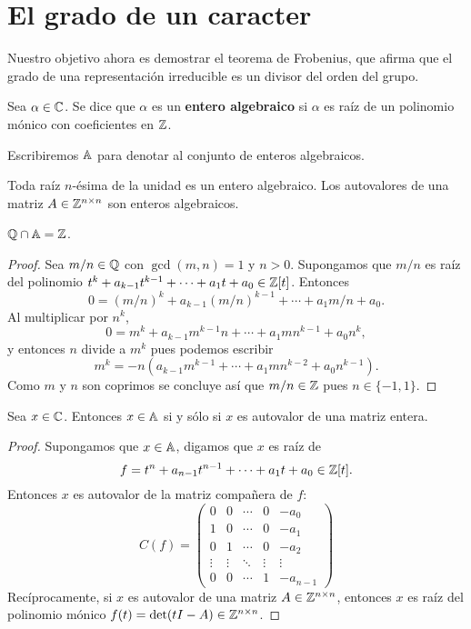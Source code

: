 \chapter{El grado de un caracter}

Nuestro objetivo ahora es demostrar el teorema de Frobenius, que afirma
que el grado de una representación irreducible es un divisor del orden del grupo. 

\begin{definition}
	Sea $\alpha\in\mathbb{C}$. Se dice que $\alpha$ es un \textbf{entero algebraico} si
	$\alpha$ es raíz de un polinomio mónico con coeficientes en $\mathbb{Z}$.  
\end{definition}

Escribiremos $\mathbb{A}$ para denotar al conjunto de enteros algebraicos.  

Toda raíz $n$-ésima de la
unidad es un entero algebraico. Los autovalores de una matriz
$A\in\mathbb{Z}^{n\times n}$ son enteros algebraicos. 

\begin{proposition}
  \label{pro:Z}
  $\mathbb{Q}\cap\mathbb{A}=\mathbb{Z}$.
\end{proposition}

\begin{proof}
  Sea $m/n\in\mathbb{Q}$ con $\gcd(m,n)=1$ y $n>0$. Supongamos que $m/n$ es raíz del
  polinomio $t^k+a_{k-1}t^{k-1}+\cdots+a_1t+a_0\in\mathbb{Z}[t]$. Entonces
  \[
	0=(m/n)^k+a_{k-1}(m/n)^{k-1}+\cdots+a_1m/n+a_0.
  \]
  Al multiplicar por $n^k$,
  \[
	0=m^k+a_{k-1}m^{k-1}n+\cdots+a_1mn^{k-1}+a_0n^{k},
  \]
  y entonces $n$ divide a $m^k$ pues podemos escribir 
  \[
	 m^k=-n(a_{k-1}m^{k-1}+\cdots+a_1mn^{k-2}+a_0n^{k-1}). 
	\]
  Como $m$ y $n$ son coprimos se concluye así que $m/n\in\mathbb{Z}$ pues $n\in\{-1,1\}$. 
\end{proof}

\begin{lemma}
  \label{lem:matriz_entera}
  Sea $x\in\mathbb{C}$. Entonces $x\in\mathbb{A}$ si y sólo si $x$ es autovalor de una matriz
  entera. 
\end{lemma}

\begin{proof}
  Supongamos que $x\in\mathbb{A}$, digamos que $x$ es raíz de
  \[
    f=t^n+a_{n-1}t^{n-1}+\cdots+a_1t+a_0\in\mathbb{Z}[t].
  \]
  Entonces $x$ es autovalor de la matriz compañera de $f$:
  \[
    C(f)=\begin{pmatrix}
      0 & 0 & \cdots &0 & -a_0\\
      1 & 0 & \cdots &0 & -a_1\\
      0 & 1 & \cdots &0 & -a_2\\
      \vdots &\vdots & \ddots & \vdots & \vdots\\
      0 & 0 & \cdots &1 & -a_{n-1}
    \end{pmatrix}
  \]
  Recíprocamente, si $x$ es autovalor de una matriz $A\in\mathbb{Z}^{n\times n}$,
  entonces $x$ es raíz del polinomio mónico $f(t)=\det(tI-A)\in\mathbb{Z}^{n\times n}$. 
\end{proof}

